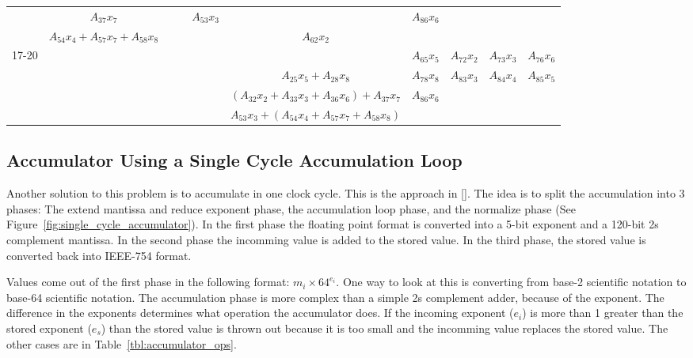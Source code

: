 \begin{sidewaystable}
\begin{tabular}{|c||c|c|c|c||c||c|c|c|c|}
        \cline{2-10}
        & $A_{37}x_7$ & & & $A_{53}x_3$ & & $A_{86}x_6$ & & & \\
        \cline{2-10}
        & $A_{54}x_4 + A_{57}x_7 + A_{58}x_8$ & & & & $A_{62}x_2$ & & & & \\
        \hline
        \hline
        \multirow{4}{*}{17-20} & & & & & & $A_{65}x_5$ & $A_{72}x_2$ & $A_{73}x_3$ & $A_{76}x_6$ \\
        \cline{2-10}
        & & & & & $A_{25}x_5 + A_{28}x_8$ & $A_{78}x_8$ & $A_{83}x_3$ & $A_{84}x_4$ & $A_{85}x_5$\\
        \cline{2-10}
        & & & & & $\left(A_{32}x_2 + A_{33}x_3 + A_{36}x_6\right) + A_{37}x_7$ & $A_{86}x_6$ & & & \\
        \cline{2-10}
        & & & & & $A_{53}x_3 + \left(A_{54}x_4 + A_{57}x_7 + A_{58}x_8\right)$ & & & & \\
        \hline


    \end{tabular}
\end{sidewaystable}

\subsection{Accumulator Using a Single Cycle Accumulation Loop}
Another solution to this problem is to accumulate in one clock cycle. This is the approach in [\cite{prelim:bachir}]. The idea is to split the accumulation into 3 phases: The extend mantissa and reduce exponent phase, the accumulation loop phase, and the normalize phase (See Figure~\ref{fig:single_cycle_accumulator}). In the first phase the floating point format is converted into a 5-bit exponent and a 120-bit 2s complement mantissa. In the second phase the incomming value is added to the stored value. In the third phase, the stored value is converted back into IEEE-754 format.

Values come out of the first phase in the following format: $m_i\times 64^{e_i}$. One way to look at this is converting from base-2 scientific notation to base-64 scientific notation. The accumulation phase is more complex than a simple 2s complement adder, because of the exponent. The difference in the exponents determines what operation the accumulator does. If the incoming exponent ($e_i$) is more than 1 greater than the stored exponent ($e_s$) than the stored value is thrown out because it is too small and the incomming value replaces the stored value. The other cases are in Table~\ref{tbl:accumulator_ops}.

